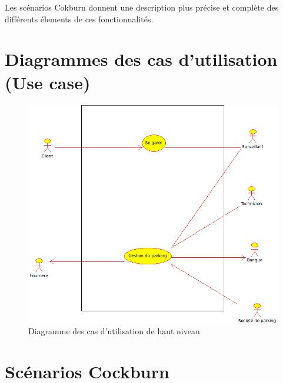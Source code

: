 \documentclass[a4paper]{article}
\begin{document}
Les sc\'enarios Cokburn donnent une description plus pr\'ecise et compl\`ete des diff\'erents
\'elements de ces fonctionnalit\'es.

\section{Diagrammes des cas d'utilisation (Use case)}
\begin{figure}[!ht]
	\centering
	\includegraphics[scale=.7]{parking.png}
	\caption{\label{usecase} Diagramme des cas d'utilisation de haut niveau}
\end{figure}
\section{Sc\'enarios Cockburn}
\end{document}

